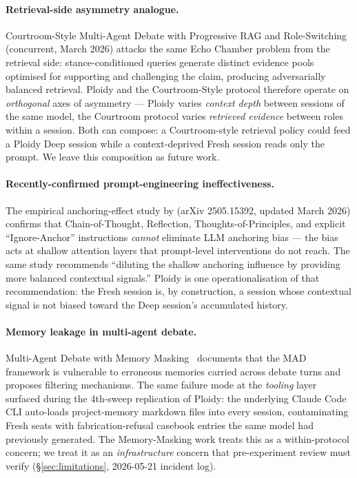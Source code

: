 \documentclass[11pt]{article}
\begin{document}
\paragraph{Retrieval-side asymmetry analogue.} Courtroom-Style Multi-Agent Debate with Progressive RAG and Role-Switching~\citep{courtroom2026rag} (concurrent, March 2026) attacks the same Echo Chamber problem from the retrieval side: stance-conditioned queries generate distinct evidence pools optimised for supporting and challenging the claim, producing adversarially balanced retrieval. Ploidy and the Courtroom-Style protocol therefore operate on \emph{orthogonal} axes of asymmetry --- Ploidy varies \emph{context depth} between sessions of the same model, the Courtroom protocol varies \emph{retrieved evidence} between roles within a session. Both can compose: a Courtroom-style retrieval policy could feed a Ploidy Deep session while a context-deprived Fresh session reads only the prompt. We leave this composition as future work.

\paragraph{Recently-confirmed prompt-engineering ineffectiveness.} The empirical anchoring-effect study by \citet{anchoring2026synthetic} (arXiv 2505.15392, updated March 2026) confirms that Chain-of-Thought, Reflection, Thoughts-of-Principles, and explicit ``Ignore-Anchor'' instructions \emph{cannot} eliminate LLM anchoring bias --- the bias acts at shallow attention layers that prompt-level interventions do not reach. The same study recommends ``diluting the shallow anchoring influence by providing more balanced contextual signals.'' Ploidy is one operationalisation of that recommendation: the Fresh session is, by construction, a session whose contextual signal is not biased toward the Deep session's accumulated history.

\paragraph{Memory leakage in multi-agent debate.} Multi-Agent Debate with Memory Masking~\citep{mad2026memorymasking} documents that the MAD framework is vulnerable to erroneous memories carried across debate turns and proposes filtering mechanisms. The same failure mode at the \emph{tooling} layer surfaced during the 4th-sweep replication of Ploidy: the underlying Claude Code CLI auto-loads project-memory markdown files into every session, contaminating Fresh seats with fabrication-refusal casebook entries the same model had previously generated. The Memory-Masking work treats this as a within-protocol concern; we treat it as an \emph{infrastructure} concern that pre-experiment review must verify (\S\ref{sec:limitations}, 2026-05-21 incident log).
\end{document}
